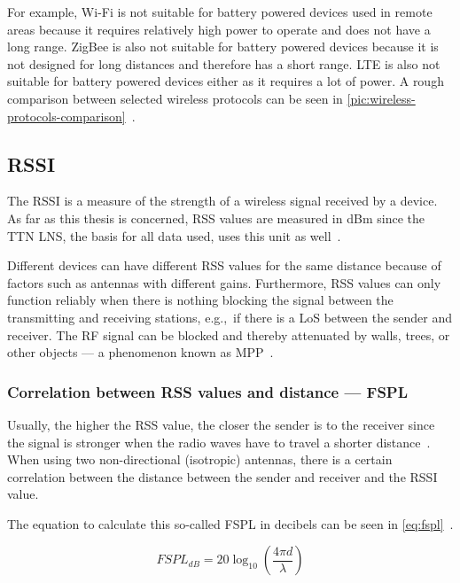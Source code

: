 For example, Wi-Fi is not suitable for battery powered devices used in remote areas because it requires relatively high power to operate and does not have a long range.
ZigBee is also not suitable for battery powered devices because it is not designed for long distances and therefore has a short range.
\ac{LTE} is also not suitable for battery powered devices either as it requires a lot of power.
A rough comparison between selected wireless protocols can be seen in \cref{pic:wireless-protocols-comparison}~\cite{wang_comparison_2021}.

\subsection{\acf{RSSI}}\label{sec:rssi}

The \acf{RSSI} is a measure of the strength of a wireless signal received by a device.
As far as this thesis is concerned, \ac{RSS} values are measured in dBm since the \ac{TTN} \ac{LNS}, the basis for all data used, uses this unit as well~\cite{the_things_industries_bv_data_2023}.

Different devices can have different \ac{RSS} values for the same distance because of factors such as antennas with different gains.
Furthermore, \ac{RSS} values can only function reliably when there is nothing blocking the signal between the transmitting and receiving stations, e.g.,\ if there is a \acl{LoS} between the sender and receiver.
The \ac{RF} signal can be blocked and thereby attenuated by walls, trees, or other objects --- a phenomenon known as \acf{MPP}~\cite{kucherov_investigation_2021}.

\subsubsection{Correlation between \acs{RSS} values and distance --- \acf{FSPL}}\label{sec:background-free-space-path-loss}

Usually, the higher the \ac{RSS} value, the closer the sender is to the receiver since the signal is stronger when the radio waves have to travel a shorter distance~\cite{stutzman_antenna_1981}.
When using two non-directional (isotropic) antennas, there is a certain correlation between the distance between the sender and receiver and the \ac{RSSI} value.

The equation to calculate this so-called \acl{FSPL} in decibels can be seen in \cref{eq:fspl}~\cite[p. 1321]{whitaker_electronics_1996}.

\begin{equation}\label{eq:fspl}
    FSPL_{dB} = 20 \log_{10}\left(\frac{4 \pi d}{\lambda}\right)
\end{equation}


